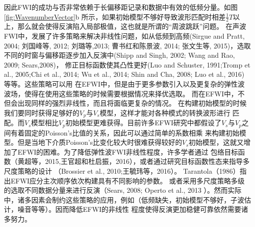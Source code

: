 因此FWI的成功与否非常依赖于长偏移距记录和数据中有效的低频分量。如图\ref{fig:WavenumberVector}b
所示，如果初始模型不够好导致波形匹配时相差$\frac{1}{2}T$以上，那么就会使得反演陷入局部极值，这也就是所谓的“周波跳跃”问题。
在声波FWI中，发展了许多策略来解决非线性问题，如从低频到高频(Sirgue and
Pratt, 2004\cite{sirgue.pratt:2004}; 刘国峰等, 2012\cite{刘国峰2012};
刘璐等,2013\cite{刘璐2013}; 曹书红和陈景波, 2014\cite{曹书红2014}; 
张文生等, 2015\cite{张文生2015})，选取不同的时窗与偏移距逐步加入反演中(Shipp and
Singh, 2002\cite{shipp:2002}; Wang and Rao, 2009\cite{WangEtAl2009}; Sears,2008\cite{sears2008})，
修正目标函数使其凸性更好(Luo and Schuster, 1991\cite{luo1991};Tromp et al.,
2005\cite{tromp2005seismic};Chi
et al., 2014\cite{ChiEtAl2014}; Wu et al., 2014\cite{Wu2014b}; Shin and Cha,
2008\cite{shin.cha:2008}; Luo et al., 2016\cite{Luo2016})等等。这些策略可以用
在EFWI中，但是由于更多参数引入以及更复杂的弹性波波场，使得在使用这些策略的时候需要根据情况来择优选取。
而在EFWI中，不但会出现同样的强烈非线性，而且将面临更复杂的情况。
在构建初始模型的时候我们要同时获得足够好的$V_p$与$V_s$模型，这样才能对各种模式的转换波形进行
匹配。而$V_s$模型相比$V_p$初始模型更难获得。目前许多EFWI研究中都假设了$V_s$与$V_p$之间有着固定的Poisson's比值的关系，因此可以通过简单的系数相乘
来构建初始模型。但是当地下介质Poisson's比变化较大时很难获得较好的$V_s$初始模型，这就又增加了EFWI的困难。为了降低弹性波FWI非线性程度，许多学者通过
包络目标函数（黄超等，2015\cite{黄超2015},王官超和杜启振，2016\cite{王官超2016}），或者通过研究目标函数性态来指导多尺度策略的设计
（Brossier et al., 2010\cite{BrossierEtAl2010};王毓玮等，2016\cite{王毓玮2016}）。
Tarantola（1986）\cite{tarantola:1986}指出EFWI应分主次顺序依次构建具有不同影响的参数。
或者采用多尺度策略多级的选取不同数据分量来进行反演（Sears, 2008\cite{sears2008}; Operto et al., 2013
\cite{operto2013guided}）。然而实际中，诸多因素会制约这些策略的应用，例如（低频缺失，初始模型不够好，子波估计，噪音等等）。因而降低EFWI的非线性
程度使得反演更加稳健可靠依然需要诸多努力。

